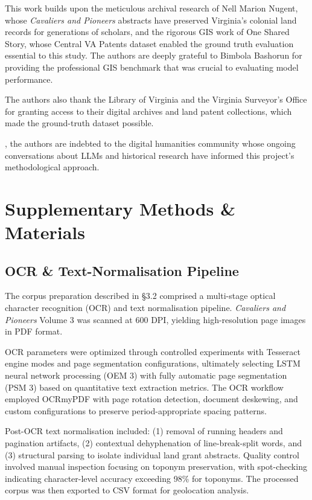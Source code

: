 This work builds upon the meticulous archival research of Nell Marion
Nugent, whose \emph{Cavaliers and Pioneers} abstracts have preserved
Virginia's colonial land records for generations of scholars, and the
rigorous GIS work of One Shared Story, whose Central VA Patents dataset
enabled the ground truth evaluation essential to this study. The authors
are deeply grateful to Bimbola Bashorun \citep{Bashorun2025_gis} for
providing the professional GIS benchmark that was crucial to evaluating
model performance.

The authors also thank the Library of Virginia and the Virginia
Surveyor's Office for granting access to their digital archives and land
patent collections, which made the ground-truth dataset possible.

\appendixFinally, the authors are indebted to the digital humanities community
whose ongoing conversations about LLMs and historical research have
informed this project's methodological approach.


\section{Supplementary Methods \&
Materials}\label{appendix-a-supplementary-methods-materials}

\subsection{OCR \& Text-Normalisation
Pipeline}\label{a.1-ocr-text-normalisation-pipeline}

The corpus preparation described in §3.2 comprised a multi-stage optical
character recognition (OCR) and text normalisation pipeline.
\emph{Cavaliers and Pioneers} Volume 3 was scanned at 600 DPI, yielding
high-resolution page images in PDF format.

OCR parameters were optimized through controlled experiments with
Tesseract engine modes and page segmentation configurations, ultimately
selecting LSTM neural network processing (OEM 3) with fully automatic
page segmentation (PSM 3) based on quantitative text extraction metrics.
The OCR workflow employed OCRmyPDF with page rotation detection,
document deskewing, and custom configurations to preserve
period-appropriate spacing patterns.

Post-OCR text normalisation included: (1) removal of running headers and
pagination artifacts, (2) contextual dehyphenation of line-break-split
words, and (3) structural parsing to isolate individual land grant
abstracts. Quality control involved manual inspection focusing on
toponym preservation, with spot-checking indicating character-level
accuracy exceeding 98\% for toponyms. The processed corpus was then
exported to CSV format for geolocation analysis.

